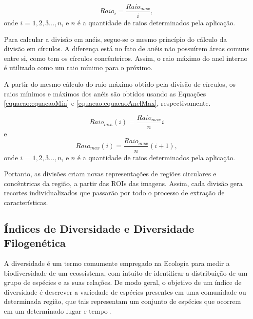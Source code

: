 
\begin{equation}
\label{equacao:equacaoCirc}
Raio_{i} = \frac{Raio_{max}}{i},
\end{equation}
onde $i$ = $1,2,3...,n$, e $n$ é a quantidade de raios determinados pela aplicação.

Para calcular a divisão em anéis, segue-se o mesmo princípio do cálculo da divisão em círculos. A diferença está no fato de anéis não possuírem áreas comuns entre si, como tem os círculos concêntricos. Assim, o raio máximo do anel interno é utilizado como um raio mínimo para o próximo.

A partir do mesmo cálculo do raio máximo obtido pela divisão de círculos, os raios mínimos e máximos dos anéis são obtidos usando as Equações \ref{equacao:equacaoMin} e \ref{equacao:equacaoAnelMax}, respectivamente.

\begin{equation}
\label{equacao:equacaoMin}
Raio_{min} (i) = \frac{Raio_{max}}{n}i
\end{equation}
e
\begin{equation}
\label{equacao:equacaoAnelMax}
Raio_{max} (i) = \frac{Raio_{max}}{n}(i + 1),  
\end{equation}onde $i$ = $1,2,3...,n$, e $n$ é a quantidade de raios determinados pela aplicação.

Portanto, as divisões criam novas representações de regiões circulares e concêntricas da região, a partir das ROIs das imagens. Assim, cada divisão gera recortes individualizados que passarão por todo o processo de extração de características.

\subsection{Índices de Diversidade e Diversidade Filogenética}
\label{sec:indicesDiversidade}

A diversidade é um termo comumente empregado na Ecologia para medir a biodiversidade de um ecossistema, com intuito de identificar a distribuição de um grupo de espécies e as suas relações. De modo geral, o objetivo de um índice de diversidade é descrever a variedade de espécies presentes em uma comunidade ou determinada região, que tais representam um conjunto de espécies que ocorrem em um determinado lugar e tempo \cite{magurran2013measuring}.

